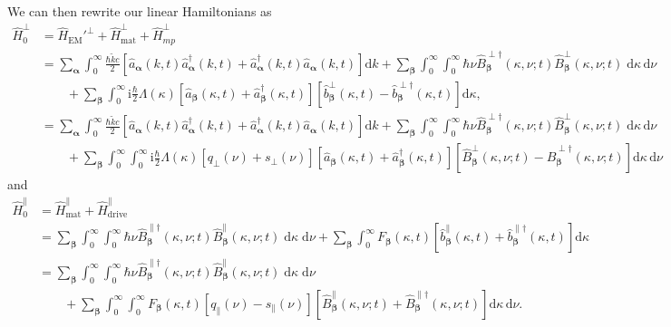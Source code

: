 \documentclass{article}
\begin{document}
We can then rewrite our linear Hamiltonians as
\begin{equation}
\begin{split}
\hat{H}_0^\perp &= \hat{H}_\mathrm{EM}'^\perp + \hat{H}_\mathrm{mat}^\perp + \hat{H}_{mp}^\perp\\
&= \sum_{\bm{\alpha}}\int_0^\infty\frac{\hbar\tilde{k}c}{2}\left[\hat{a}_{\bm{\alpha}}(k,t)\hat{a}_{\bm{\alpha}}^\dagger(k,t) + \hat{a}_{\bm{\alpha}}^\dagger(k,t)\hat{a}_{\bm{\alpha}}(k,t)\right]\mathrm{d}k + \sum_{\bm{\beta}}\int_0^\infty\int_0^\infty\hbar\nu\hat{B}_{\bm{\beta}}^{\perp\dagger}(\kappa,\nu;t)\hat{B}_{\bm{\beta}}^\perp(\kappa,\nu;t)\;\mathrm{d}\kappa\,\mathrm{d}\nu\\
&\qquad + \sum_{\bm{\beta}}\int_0^\infty\mathrm{i}\frac{\hbar}{2}\Lambda(\kappa)\left[\hat{a}_{\bm{\beta}}(\kappa,t) + \hat{a}_{\bm{\beta}}^\dagger(\kappa,t)\right]\left[\hat{b}_{\bm{\beta}}^\perp(\kappa,t) - \hat{b}_{\bm{\beta}}^{\perp\dagger}(\kappa,t)\right]\mathrm{d}\kappa,\\
&= \sum_{\bm{\alpha}}\int_0^\infty\frac{\hbar\tilde{k}c}{2}\left[\hat{a}_{\bm{\alpha}}(k,t)\hat{a}_{\bm{\alpha}}^\dagger(k,t) + \hat{a}_{\bm{\alpha}}^\dagger(k,t)\hat{a}_{\bm{\alpha}}(k,t)\right]\mathrm{d}k + \sum_{\bm{\beta}}\int_0^\infty\int_0^\infty\hbar\nu\hat{B}_{\bm{\beta}}^{\perp\dagger}(\kappa,\nu;t)\hat{B}_{\bm{\beta}}^\perp(\kappa,\nu;t)\;\mathrm{d}\kappa\,\mathrm{d}\nu\\
&\qquad + \sum_{\bm{\beta}}\int_0^\infty\int_0^\infty\mathrm{i}\frac{\hbar}{2}\Lambda(\kappa)\left[q_\perp(\nu) + s_\perp(\nu)\right]\left[\hat{a}_{\bm{\beta}}(\kappa,t) + \hat{a}_{\bm{\beta}}^\dagger(\kappa,t)\right]\left[\hat{B}_{\bm{\beta}}^\perp(\kappa,\nu;t) - \hat{B}_{\bm{\beta}}^{\perp\dagger}(\kappa,\nu;t)\right]\mathrm{d}\kappa\,\mathrm{d}\nu
\end{split}
\end{equation}
and
\begin{equation}
\begin{split}
\hat{H}_0^\parallel &= \hat{H}_\mathrm{mat}^\parallel + \hat{H}_\mathrm{drive}^\parallel\\
&= \sum_{\bm{\beta}}\int_0^\infty\int_0^\infty\hbar\nu\hat{B}_{\bm{\beta}}^{\parallel\dagger}(\kappa,\nu;t)\hat{B}_{\bm{\beta}}^\parallel(\kappa,\nu;t)\;\mathrm{d}\kappa\;\mathrm{d}\nu + \sum_{\bm{\beta}}\int_0^\infty F_{\bm{\beta}}(\kappa,t)\left[\hat{b}_{\bm{\beta}}^\parallel(\kappa,t) + \hat{b}_{\bm{\beta}}^{\parallel\dagger}(\kappa,t)\right]\mathrm{d}\kappa\\
&= \sum_{\bm{\beta}}\int_0^\infty\int_0^\infty\hbar\nu\hat{B}_{\bm{\beta}}^{\parallel\dagger}(\kappa,\nu;t)\hat{B}_{\bm{\beta}}^\parallel(\kappa,\nu;t)\;\mathrm{d}\kappa\;\mathrm{d}\nu\\
&\qquad + \sum_{\bm{\beta}}\int_0^\infty\int_0^\infty F_{\bm{\beta}}(\kappa,t)\left[q_\parallel(\nu) - s_\parallel(\nu)\right]\left[\hat{B}_{\bm{\beta}}^\parallel(\kappa,\nu;t) + \hat{B}_{\bm{\beta}}^{\parallel\dagger}(\kappa,\nu;t)\right]\mathrm{d}\kappa\,\mathrm{d}\nu.
\end{split}
\end{equation}
\end{document}
